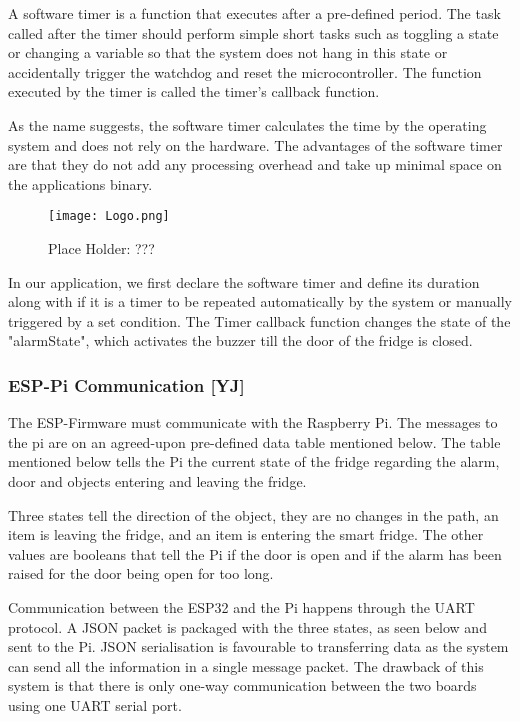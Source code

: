 A software timer is a function that executes after a pre-defined period.
The task called after the timer should perform simple short tasks such as toggling a state or changing a variable so that the system does not hang in this state or accidentally trigger the watchdog and reset the microcontroller.
The function executed by the timer is called the timer's callback function.

As the name suggests, the software timer calculates the time by the operating system and does not rely on the hardware.
The advantages of the software timer are that they do not add any processing overhead and take up minimal space on the applications binary.

\begin{figure}[H]        
    \centering
    \texttt{[image: Logo.png]}
    \caption{Place Holder: ???}
    \label{fig:placeholder}
\end{figure} 

In our application, we first declare the software timer and define its duration along with if it is a timer to be repeated automatically by the system or manually triggered by a set condition.
The Timer callback function changes the state of the "alarmState", which activates the buzzer till the door of the fridge is closed.

\subsubsection{ESP-Pi Communication [YJ]}

The ESP-Firmware must communicate with the Raspberry Pi.
The messages to the pi are on an agreed-upon pre-defined data table mentioned below.
The table mentioned below tells the Pi the current state of the fridge regarding the alarm, door and objects entering and leaving the fridge.



Three states tell the direction of the object, they are no changes in the path, an item is leaving the fridge, and an item is entering the smart fridge.
The other values are booleans that tell the Pi if the door is open and if the alarm has been raised for the door being open for too long.

Communication between the ESP32 and the Pi happens through the UART protocol.
A JSON packet is packaged with the three states, as seen below and sent to the Pi.
JSON serialisation is favourable to transferring data as the system can send all the information in a single message packet.
The drawback of this system is that there is only one-way communication between the two boards using one UART serial port.

